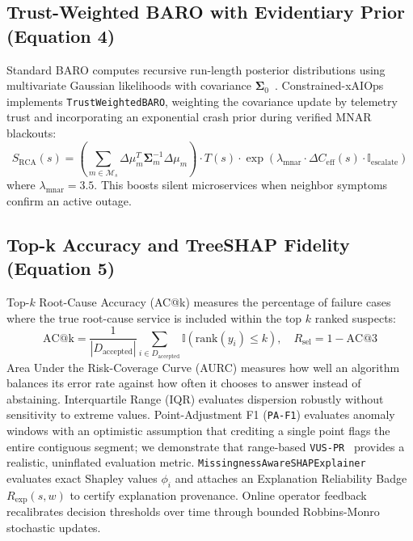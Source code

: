 \documentclass[conference]{IEEEtran}
\begin{document}
\subsection{Trust-Weighted BARO with Evidentiary Prior (Equation 4)}
Standard BARO computes recursive run-length posterior distributions using multivariate Gaussian likelihoods with covariance $\boldsymbol{\Sigma}_0$~\cite{pham2024baro}.
Constrained-xAIOps implements \texttt{TrustWeightedBARO}, weighting the covariance update by telemetry trust and incorporating an exponential crash prior during verified MNAR blackouts:
\begin{equation}
S_{\text{RCA}}(s) = \left( \sum_{m \in \mathcal{M}_s} \Delta \mu_m^T \boldsymbol{\Sigma}_m^{-1} \Delta \mu_m \right) \cdot T(s) \cdot \exp\left( \lambda_{\text{mnar}} \cdot \Delta C_{\text{eff}}(s) \cdot \mathbb{I}_{\text{escalate}} \right)
\label{eq:baro_score}
\end{equation}
where $\lambda_{\text{mnar}} = 3.5$.
This boosts silent microservices when neighbor symptoms confirm an active outage.

\subsection{Top-k Accuracy and TreeSHAP Fidelity (Equation 5)}
Top-$k$ Root-Cause Accuracy (AC@k) measures the percentage of failure cases where the true root-cause service is included within the top $k$ ranked suspects:
\begin{equation}
\text{AC@k} = \frac{1}{|D_{\text{accepted}}|} \sum_{i \in D_{\text{accepted}}} \mathbb{I}(\text{rank}(y_i) \le k), \quad R_{\text{sel}} = 1 - \text{AC@3}
\label{eq:metrics}
\end{equation}
Area Under the Risk-Coverage Curve (AURC) measures how well an algorithm balances its error rate against how often it chooses to answer instead of abstaining.
Interquartile Range (IQR) evaluates dispersion robustly without sensitivity to extreme values.
Point-Adjustment F1 (\texttt{PA-F1}) evaluates anomaly windows with an optimistic assumption that crediting a single point flags the entire contiguous segment; we demonstrate that range-based \texttt{VUS-PR}~\cite{paparrizos2022vus} provides a realistic, uninflated evaluation metric.
\texttt{MissingnessAwareSHAPExplainer}~\cite{lundberg2020local} evaluates exact Shapley values $\phi_i$ and attaches an Explanation Reliability Badge $R_{\text{exp}}(s, w)$ to certify explanation provenance.
Online operator feedback recalibrates decision thresholds over time through bounded Robbins-Monro stochastic updates.
\end{document}

